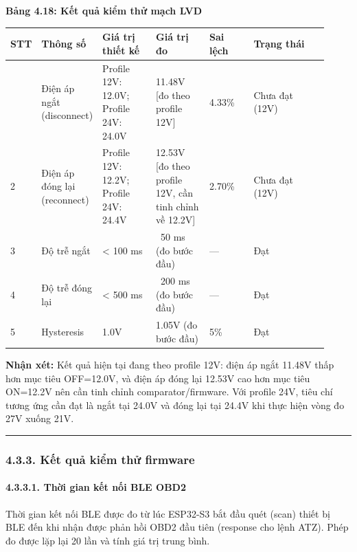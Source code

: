 \documentclass[13pt,a4paper]{extarticle}
\newcounter{none} %
\newcommand{\thesislongtableorignewline}{}
\let\thesislongtableorignewline\\
\renewcommand{\\}{\thesislongtableorignewline\hline}%
\let\\\thesislongtableorignewline
\newcommand{\thesistabletitle}[1]{%
  \begin{center}\textbf{#1}\end{center}%
}
\begin{document}
\thesistabletitle{Bảng 4.18: Kết quả kiểm thử mạch LVD}

{\def\LTcaptype{none} %
\begin{longtable}{|p{0.06\linewidth}|p{0.14\linewidth}|p{0.17\linewidth}|p{0.17\linewidth}|p{0.14\linewidth}|p{0.24\linewidth}|}
\hline \textbf{STT} & \textbf{Thông số} & \textbf{Giá trị thiết kế} & \textbf{Giá trị đo} & \textbf{Sai lệch} & \textbf{Trạng
thái} \\
\hline
\endhead
\hline
\endlastfoot
1 & Điện áp ngắt (disconnect) & Profile 12V: 12.0V; Profile 24V: 24.0V &
11.48V {[}đo theo profile 12V{]} & 4.33\% & Chưa đạt (12V) \\
2 & Điện áp đóng lại (reconnect) & Profile 12V: 12.2V; Profile 24V:
24.4V & 12.53V {[}đo theo profile 12V, cần tinh chỉnh về 12.2V{]} &
2.70\% & Chưa đạt (12V) \\
3 & Độ trễ ngắt & \textless{} 100 ms & ~50 ms (đo bước
đầu) & --- & Đạt \\
4 & Độ trễ đóng lại & \textless{} 500 ms & ~200 ms (đo
bước đầu) & --- & Đạt \\
5 & Hysteresis & 1.0V & 1.05V (đo bước đầu) & 5\% & Đạt \\
\end{longtable}
}

\textbf{Nhận xét:} Kết quả hiện tại đang theo profile 12V: điện áp ngắt
11.48V thấp hơn mục tiêu OFF=12.0V, và điện áp đóng lại 12.53V cao hơn
mục tiêu ON=12.2V nên cần tinh chỉnh comparator/firmware. Với profile
24V, tiêu chí tương ứng cần đạt là ngắt tại 24.0V và đóng lại tại 24.4V
khi thực hiện vòng đo 27V xuống 21V.

\begin{center}\rule{0.5\linewidth}{0.5pt}\end{center}

\subsubsection{4.3.3. Kết quả kiểm thử
firmware}\label{433-kux1ebft-quux1ea3-kiux1ec3m-thux1eed-firmware}

\paragraph{4.3.3.1. Thời gian kết nối BLE
OBD2}\label{4331-thux1eddi-gian-kux1ebft-nux1ed1i-ble-obd2}

Thời gian kết nối BLE được đo từ lúc ESP32-S3 bắt đầu quét (scan) thiết
bị BLE đến khi nhận được phản hồi OBD2 đầu tiên (response cho lệnh ATZ).
Phép đo được lặp lại 20 lần và tính giá trị trung bình.
\end{document}
